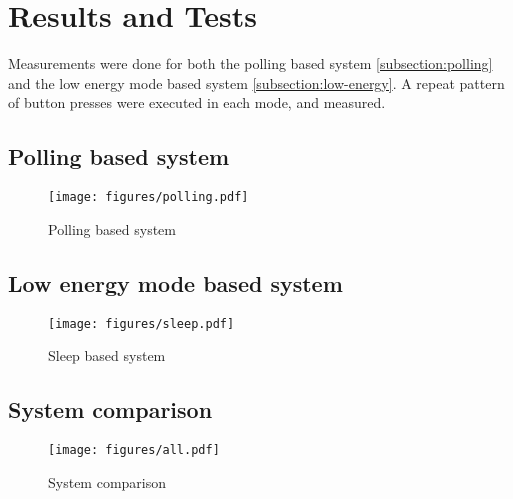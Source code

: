 \section{Results and Tests}

Measurements were done for both the polling based system \ref{subsection:polling} and the low energy mode based system \ref{subsection:low-energy}. A repeat pattern of button presses were executed in each mode, and measured.

\subsection{Polling based system}

\begin{figure}[h]
\centering
\texttt{[image: figures/polling.pdf]}
\caption{Polling based system}
\label{fig:polling-based-system}
\end{figure}

\subsection{Low energy mode based system}

\begin{figure}[h]
\centering
\texttt{[image: figures/sleep.pdf]}
\caption{Sleep based system}
\label{fig:sleep-based-system}
\end{figure}

\subsection{System comparison}

\begin{figure}[h]
\centering
\texttt{[image: figures/all.pdf]}
\caption{System comparison}
\label{fig:system-comparison}
\end{figure}
